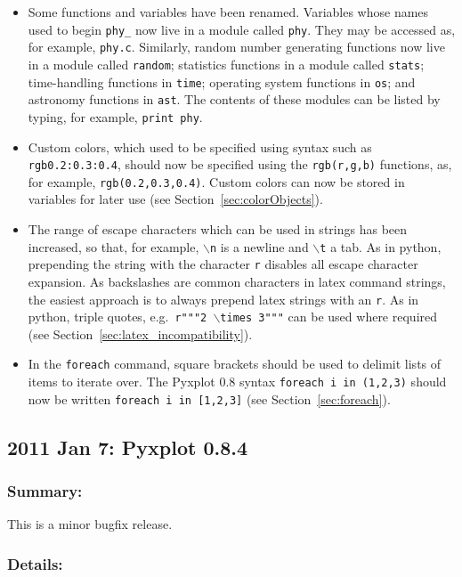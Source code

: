 \begin{itemize}
\item Some functions and variables have been renamed. Variables whose names used to begin {\tt phy\_} now live in a module called {\tt phy}. They may be accessed as, for example, {\tt phy.c}. Similarly, random number generating functions now live in a module called {\tt random}; statistics functions in a module called {\tt stats}; time-handling functions in {\tt time}; operating system functions in {\tt os}; and astronomy functions in {\tt ast}. The contents of these modules can be listed by typing, for example, {\tt print phy}.
\item Custom colors, which used to be specified using syntax such as {\tt rgb0.2:0.3:0.4}, should now be specified using the {\tt rgb(r,g,b)} functions, as, for example, {\tt rgb(0.2,0.3,0.4)}. Custom colors can now be stored in variables for later use (see Section~\ref{sec:colorObjects}).
\item The range of escape characters which can be used in strings has been increased, so that, for example, {\tt $\backslash$n} is a newline and {\tt $\backslash$t} a tab. As in python, prepending the string with the character {\tt r} disables all escape character expansion. As backslashes are common characters in latex command strings, the easiest approach is to always prepend latex strings with an {\tt r}. As in python, triple quotes, e.g.\ {\tt r"""2 $\backslash$times 3"""} can be used where required (see Section~\ref{sec:latex_incompatibility}).
\item In the {\tt foreach} command, square brackets should be used to delimit lists of items to iterate over. The Pyxplot 0.8 syntax {\tt foreach i in (1,2,3)} should now be written {\tt foreach i in [1,2,3]} (see Section~\ref{sec:foreach}).
\end{itemize}

\subsection*{2011 Jan 7: Pyxplot 0.8.4}

\subsubsection*{Summary:}

This is a minor bugfix release.

\subsubsection*{Details:}

